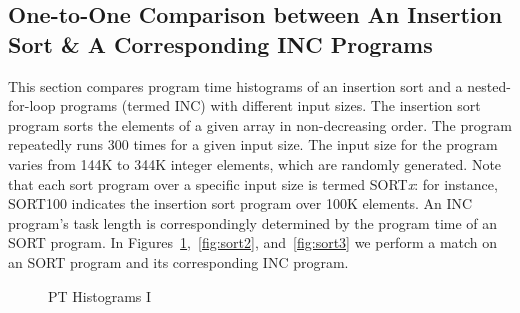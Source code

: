 \documentclass[10pt]{article}
\begin{document}
\newpage
\clearpage

\subsection{One-to-One Comparison between An Insertion Sort \& A Corresponding INC Programs~\label{sec:sort}} 
This section compares program time histograms 
of an insertion sort and a nested-for-loop programs (termed INC) with different input sizes. The insertion sort program sorts the elements of a given array in non-decreasing order.  The program repeatedly runs 300 times for a given input size. The input size for the program varies from 144K to 344K integer elements, which are randomly generated. Note that each sort program over a specific input size is termed SORT{\it x}: for instance, SORT100 indicates the insertion sort program over 100K elements. An INC program's task length is correspondingly determined by the program time of an SORT program. In Figures~\ref{fig:sort1},~\ref{fig:sort2}, and~\ref{fig:sort3} 
we perform a match on an SORT program and its corresponding INC program.

%

\begin{figure}[h]
	\centering
	\caption{PT Histograms I~\label{fig:sort1}}
\end{figure}

\clearpage
\pagebreak
\end{document}
